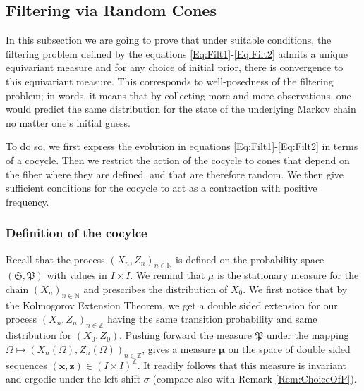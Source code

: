 \documentclass{article}
\newcommand{\1}{\mathbbm{1}}
\newcommand{\bo}{\boldsymbol}
\newcommand{\N}{\mathbb N}
\newcommand{\Z}{\mathbb Z}
\begin{document}

\subsection{Filtering via Random Cones}
In this subsection we are going to prove that under suitable conditions, the filtering problem defined by the equations \eqref{Eq:Filt1}-\eqref{Eq:Filt2} admits a unique equivariant measure and for any choice of initial prior, there is convergence to this equivariant measure. This corresponds to well-posedness of the filtering problem; in words, it means that by collecting more and more observations, one would predict the same distribution for the state of the underlying Markov chain no matter one's initial guess.

To do so, we first express the evolution in equations \eqref{Eq:Filt1}-\eqref{Eq:Filt2} in terms of a cocycle. Then we restrict the action of the cocycle to cones that depend on the fiber where they are defined, and that are therefore random. We then give sufficient conditions for the cocycle to act as a contraction with positive frequency.

\subsubsection{Definition of the cocylce}
Recall that the process $(X_n,Z_n)_{n\in \N}$ is defined on the probability space $\left(\mathfrak{S}, \mathfrak{P}\right)$ with values in $I\times I.$ We remind that  $\mu$ is the stationary measure for the chain $(X_n)_{n\in \N}$ and prescribes the distribution of $X_0$. We first notice that by the Kolmogorov Extension Theorem, we get a double sided extension for our process $(X_n,Z_n)_{n\in \Z}$ having the same transition probability and same distribution for $(X_0,Z_0)$. Pushing forward the measure $\mathfrak{P}$ under the mapping $\Omega\mapsto (X_n(\Omega),Z_n(\Omega))_{n\in \Z}$, gives a measure $\bo \mu$  on the space of double sided sequences $(\bo x,\bo z)\in (I\times I)^\Z$.  It readily follows that this measure is invariant and ergodic under the left shift $\sigma$ (compare also with Remark \ref{Rem:ChoiceOfP}).
\end{document}
